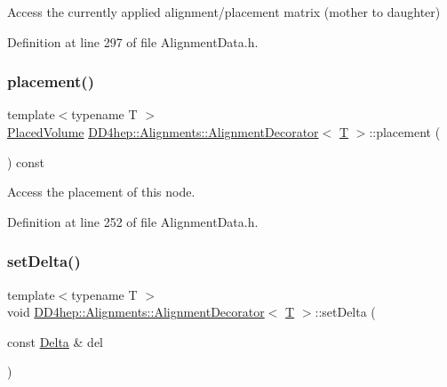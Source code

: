 Access the currently applied alignment/placement matrix (mother to daughter) 



Definition at line 297 of file Alignment\+Data.\+h.

\hypertarget{class_d_d4hep_1_1_alignments_1_1_alignment_decorator_a53596530d2a2f65f640f4016fe41e930}{}\label{class_d_d4hep_1_1_alignments_1_1_alignment_decorator_a53596530d2a2f65f640f4016fe41e930} 
\subsubsection{\texorpdfstring{placement()}{placement()}}
{\footnotesize\ttfamily template$<$typename T $>$ \\
\hyperlink{class_d_d4hep_1_1_alignments_1_1_alignment_decorator_a3dc9016a6686627ec2e6584aed9c8eeb}{Placed\+Volume} \hyperlink{class_d_d4hep_1_1_alignments_1_1_alignment_decorator}{D\+D4hep\+::\+Alignments\+::\+Alignment\+Decorator}$<$ \hyperlink{class_t}{T} $>$\+::placement (\begin{DoxyParamCaption}{ }\end{DoxyParamCaption}) const\hspace{0.3cm}{\ttfamily [inline]}}



Access the placement of this node. 



Definition at line 252 of file Alignment\+Data.\+h.

\hypertarget{class_d_d4hep_1_1_alignments_1_1_alignment_decorator_a6eec8976056b3a07c214ad809f403b67}{}\label{class_d_d4hep_1_1_alignments_1_1_alignment_decorator_a6eec8976056b3a07c214ad809f403b67} 
\subsubsection{\texorpdfstring{set\+Delta()}{setDelta()}\hspace{0.1cm}{\footnotesize\ttfamily [1/4]}}
{\footnotesize\ttfamily template$<$typename T $>$ \\
void \hyperlink{class_d_d4hep_1_1_alignments_1_1_alignment_decorator}{D\+D4hep\+::\+Alignments\+::\+Alignment\+Decorator}$<$ \hyperlink{class_t}{T} $>$\+::set\+Delta (\begin{DoxyParamCaption}\item[{const \hyperlink{class_d_d4hep_1_1_alignments_1_1_alignment_decorator_aafa729192cc27e7d36f6e9cfd3484289}{Delta} \&}]{del }\end{DoxyParamCaption})\hspace{0.3cm}{\ttfamily [inline]}}



